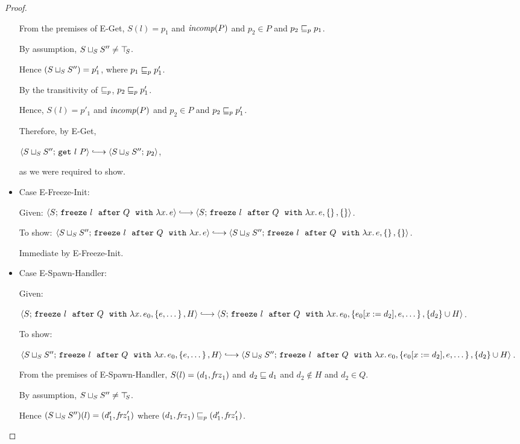 \begin{proof}
\begin{itemize}
      From the premises of {\sc E-Get}, $S(l) = p_1$ and $\mathit{incomp}(P)$
      and $p_2 \in P$ and $p_2 \sqsubseteq_p p_1$.

      By assumption, $S \sqcup_{S} S'' \neq \top\hspace{-0.85mm}_{S}$.

      Hence $(S \sqcup_{S} S'') = p'_1$, where $p_1 \sqsubseteq_p p'_1$.

      By the transitivity of $\sqsubseteq_p$, $p_2 \sqsubseteq_p p'_1$.

      Hence, $S(l) = p'_1$ and $\mathit{incomp}(P)$ and $p_2 \in P$ and $p_2
      \sqsubseteq_p p'_1$.

      Therefore, by {\sc E-Get},

      $\config{\lubstore{S}{S''}}{\getexp{l}{P}} \parstepsto
      \config{\lubstore{S}{S''}}{p_2}$,

      as we were required to show.

    \item Case {\sc E-Freeze-Init}:

      Given: $\config{S}{\freezeafter{l}{Q}{\lam{x}{e}}} \parstepsto
      \config{S}{\freezeafterfull{l}{Q}{\lam{x}{e}}{\setof{}}{\setof{}}}$.

      To show:
      $\config{\lubstore{S}{S''}}{\freezeafter{l}{Q}{\lam{x}{e}}}
      \parstepsto
      \config{\lubstore{S}{S''}}{\freezeafterfull{l}{Q}{\lam{x}{e}}{\setof{}}{\setof{}}}$.

      Immediate by {\sc E-Freeze-Init}.

    \item Case {\sc E-Spawn-Handler}:

      Given:

      $\config{S}{\freezeafterfull{l}{Q}{\lam{x}{e_0}}{\setof{e,
            \dots}}{H}} \parstepsto
      \config{S}{\freezeafterfull{l}{Q}{\lam{x}{e_0}}{\setof{\subst{e_0}{x}{d_2},
            e, \dots}} {\{d_2\}\cup H}}$.

      To show:

      $\config{\lubstore{S}{S''}}{\freezeafterfull{l}{Q}{\lam{x}{e_0}}{\setof{e,
            \dots}}{H}} \parstepsto
      \config{\lubstore{S}{S''}}{\freezeafterfull{l}{Q}{\lam{x}{e_0}}{\setof{\subst{e_0}{x}{d_2},
            e, \dots}} {\{d_2\}\cup H}}$.

      From the premises of {\sc E-Spawn-Handler}, $S(l) =
      (d_1, \mathit{frz}_1)$ and $d_2 \sqsubseteq d_1$ and $d_2 \notin
      H$ and $d_2 \in Q$.

      By assumption, $S \sqcup_{S} S'' \neq \top\hspace{-0.85mm}_{S}$.

      Hence $(S \sqcup_{S} S'')(l) = (d'_1, \mathit{frz}'_1)$ where
      $(d_1, \mathit{frz}_1) \sqsubseteq_p (d'_1, \mathit{frz}'_1)$.


\end{itemize}
\end{proof}
